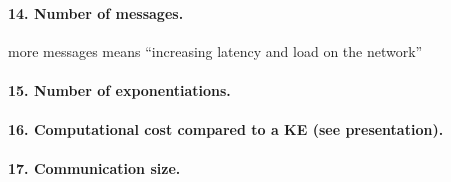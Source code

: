 \documentclass[../report.tex]{subfiles}
\begin{document}



\paragraph{14. Number of messages.}
more messages means ``increasing latency and load on the network''


\paragraph{15. Number of exponentiations.}


\paragraph{16. Computational cost compared to a KE (see \cite{KHAPE_Paper} presentation).}


\paragraph{17. Communication size.}
\end{document}
